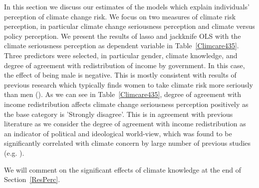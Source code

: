 \documentclass[a4paper,12pt]{article}
\begin{document}
In this section we discuss our estimates of the models which explain individuals' perception of climate change risk. We focus on two measures of climate risk perception, in particular climate change seriousness perception and climate versus policy perception. We present the results of lasso and jackknife OLS with the climate seriousness perception as dependent variable in Table~\ref{Climcare435}. Three predictors were selected, in particular gender, climate knowledge, and degree of agreement with redistribution of income by government. In this case, the effect of being male is negative. This is mostly consistent with results of previous research which typically finds women to take climate risk more seriously than men (\citealp{WHITMARSH2011, McCright2010, Kahan2007}). As we can see in Table~\ref{Climcare435}, degree of agreement with income redistribution affects climate change seriousness perception positively as the base category is 'Strongly disagree'. This is in agreement with previous literature as we consider the degree of agreement with income redistribution as an indicator of political and ideological world-view, which was found to be significantly correlated with climate concern by large number of previous studies (e.g. \citealp{Leiserowitz2013, Kahan2012, WHITMARSH2011}). 

We will comment on the significant effects of climate knowledge at the end of Section~\ref{ResPerc}.
\end{document}
